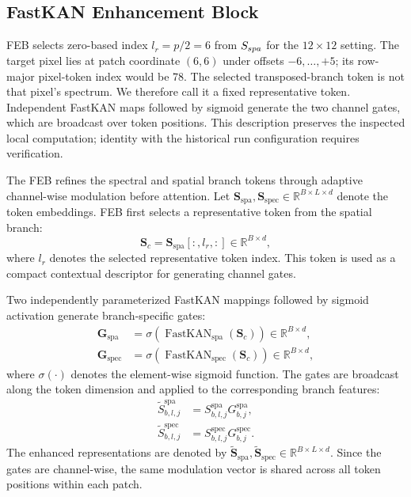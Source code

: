 \documentclass{revision_assets/ieeeaccess_revision}
\newif\ifrevisionhighlights
\newenvironment{revision}{\ifrevisionhighlights\begin{shaded*}\fi}{\ifrevisionhighlights\end{shaded*}\fi}
\begin{document}
\subsection{FastKAN Enhancement Block}
\begin{revision}
FEB selects zero-based index $l_r=p/2=6$ from $S_{\rm spa}$ for the $12\times12$ setting. The target pixel lies at patch coordinate $(6,6)$ under offsets $-6,\ldots,+5$; its row-major pixel-token index would be 78. The selected transposed-branch token is not that pixel's spectrum. We therefore call it a fixed representative token. Independent FastKAN maps followed by sigmoid generate the two channel gates, which are broadcast over token positions. This description preserves the inspected local computation; identity with the historical run configuration requires verification.
\end{revision}

\label{sec:feb}

The FEB refines the spectral and spatial branch tokens through adaptive channel-wise modulation before attention. Let
$\mathbf{S}_{\mathrm{spa}},\mathbf{S}_{\mathrm{spec}}\in\mathbb{R}^{B\times L\times d}$ denote the token embeddings. FEB first selects a representative token from the spatial branch:
\begin{equation}
\mathbf{S}_{c}
=
\mathbf{S}_{\mathrm{spa}}[:,l_r,:]
\in
\mathbb{R}^{B\times d},
\label{eq:feb_anchor}
\end{equation}
where $l_r$ denotes the selected representative token index. This token is used as a compact contextual descriptor for generating channel gates.

Two independently parameterized FastKAN mappings followed by sigmoid activation generate branch-specific gates:
\begin{equation}
\begin{aligned}
\mathbf{G}_{\mathrm{spa}}
&=
\sigma\left(
\operatorname{FastKAN}_{\mathrm{spa}}(\mathbf{S}_{c})
\right)
\in
\mathbb{R}^{B\times d}, \\
\mathbf{G}_{\mathrm{spec}}
&=
\sigma\left(
\operatorname{FastKAN}_{\mathrm{spec}}(\mathbf{S}_{c})
\right)
\in
\mathbb{R}^{B\times d},
\end{aligned}
\label{eq:feb_gate}
\end{equation}
where $\sigma(\cdot)$ denotes the element-wise sigmoid function. The gates are broadcast along the token dimension and applied to the corresponding branch features:
\begin{equation}
\begin{aligned}
\widetilde{S}^{\mathrm{spa}}_{b,l,j}
&=
S^{\mathrm{spa}}_{b,l,j}
G^{\mathrm{spa}}_{b,j}, \\
\widetilde{S}^{\mathrm{spec}}_{b,l,j}
&=
S^{\mathrm{spec}}_{b,l,j}
G^{\mathrm{spec}}_{b,j}.
\end{aligned}
\label{eq:feb_output}
\end{equation}
The enhanced representations are denoted by
$\widetilde{\mathbf{S}}_{\mathrm{spa}},\widetilde{\mathbf{S}}_{\mathrm{spec}}\in\mathbb{R}^{B\times L\times d}$. Since the gates are channel-wise, the same modulation vector is shared across all token positions within each patch.
\end{document}
